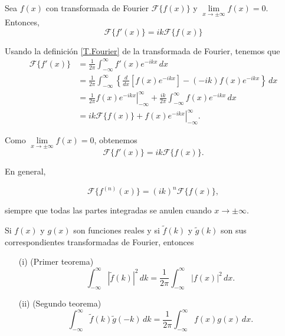 \begin{propo}
Sea $f(x)$ con transformada de Fourier $\mathcal{F}\{f(x)\}$ y $\lim\limits_{x \to \pm \infty} f(x) = 0$. Entonces, 
$$\boxed{\mathcal{F}\{f'(x)\} = i k \mathcal{F}\{f(x)\}}$$
\end{propo}

\begin{demo}
Usando la definición \eqref{T.Fourier} de la transformada de Fourier, tenemos que 
\begin{align*}
    \mathcal{F}\{f'(x)\} &= \frac{1}{2\pi} \int_{- \infty}^{\infty} f'(x) e^{-ikx} \,dx \\
    &= \frac{1}{2\pi} \int_{- \infty}^{\infty} \left\{ \frac{d}{dx}\left[ f(x) e^{-ikx} \right]  - (-ik) f(x) e^{-ikx} \right\}\,dx \\
    &= \frac{1}{2\pi} \left. f(x) e^{-ikx} \right|_{-\infty}^{\infty} + \frac{ik}{2\pi} \int_{- \infty}^{\infty}  f(x) e^{-ikx} \,dx \\
    &=  ik \mathcal{F}\{f(x)\} + \left. f(x) e^{-ikx} \right|_{-\infty}^{\infty}.
\end{align*}

Como  $\lim\limits_{x \to \pm \infty} f(x) = 0$, obtenemos
$$\mathcal{F}\{f'(x)\} = i k \mathcal{F}\{f(x)\}.$$
\end{demo}

En general,
\begin{shaded}
$$\mathcal{F}\{f^{(n)} (x)\} = (i k)^n \mathcal{F}\{f(x)\},$$    
\end{shaded}

siempre que todas las partes integradas se anulen cuando $x \to \pm \infty$.

\begin{teorema}[de Parseval]
Si $f(x)$ y $g(x)$ son funciones reales y si $\tilde{f}(k)$ y $\tilde{g}(k)$ son sus correspondientes transformadas de Fourier, entonces

\begin{itemize}
    \item[(i)] (Primer teorema)
    $$\int_{-\infty}^{\infty} |\tilde{f}(k)|^2\, dk = \frac{1}{2\pi} \int_{-\infty}^{\infty} |f(x)|^2 \, dx. $$
    
    \item[(ii)] (Segundo teorema)
    $$\int_{-\infty}^{\infty} \tilde{f}(k) \tilde{g}(-k) \, dk = \frac{1}{2\pi} \int_{-\infty}^{\infty} f(x) g(x) \, dx. $$
    
\end{itemize}
\end{teorema}

